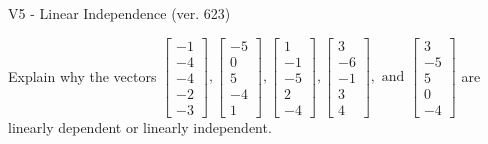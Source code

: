 \begin{exercise}
  \begin{exerciseTitle}V5 - Linear Independence (ver. 623)\end{exerciseTitle}
  \begin{exerciseStatement}
    Explain why the vectors \(\left[\begin{array}{r}
-1 \\
-4 \\
-4 \\
-2 \\
-3
\end{array}\right] , \left[\begin{array}{r}
-5 \\
0 \\
5 \\
-4 \\
1
\end{array}\right] , \left[\begin{array}{r}
1 \\
-1 \\
-5 \\
2 \\
-4
\end{array}\right] , \left[\begin{array}{r}
3 \\
-6 \\
-1 \\
3 \\
4
\end{array}\right] , \text{ and } \left[\begin{array}{r}
3 \\
-5 \\
5 \\
0 \\
-4
\end{array}\right]\) are linearly dependent or linearly independent.	



\end{exerciseStatement}
\end{exercise}

